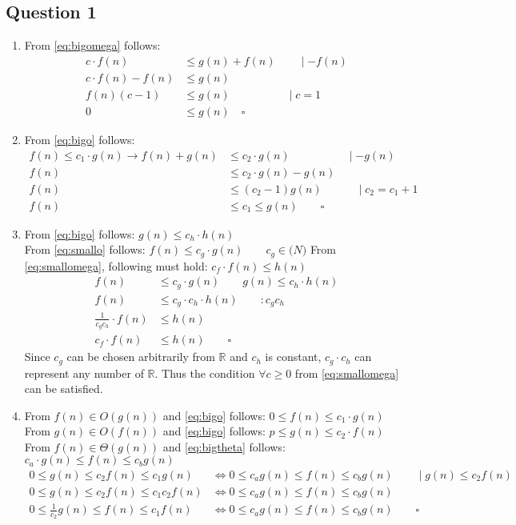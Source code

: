 \documentclass[10pt,a4paper,oneside]{report}
\begin{document}
\subsection{Question 1}
\begin{enumerate}
	\item From \ref{eq:bigomega} follows: \begin{align*}
			c\cdot f(n)&\leq g(n)+f(n)\qquad\mid -f(n)	\\
			c\cdot f(n)-f(n)&\leq g(n)					\\
			f(n)(c-1)&\leq g(n)\qquad\qquad\quad\mid c=1			\\
			0&\leq g(n)\quad\square
		\end{align*}
		
	\item From \ref{eq:bigo} follows: \begin{align*}
			f(n)\leq c_{1}\cdot g(n)\longrightarrow f(n)+g(n)&\leq c_{2}\cdot g(n)\qquad\qquad\quad\mid -g(n)\\
			f(n)&\leq c_{2}\cdot g(n)-g(n)				\\
			f(n)&\leq (c_{2}-1)g(n)\qquad\quad\mid c_{2}=c_{1}+1	\\
			f(n)&\leq c_{1}\leq g(n)\qquad\square
		\end{align*}
		
	\item From \ref{eq:bigo} follows: $g(n)\leq c_{h}\cdot h(n)$\\
		From \ref{eq:smallo} follows: $f(n)\leq c_{g}\cdot g(n)\qquad c_{g}\in\mathbb(N)$
		From \ref{eq:smallomega}, following must hold: $c_{f}\cdot f(n)\leq h(n)$
		\begin{align*}
			f(n)&\leq c_{g}\cdot g(n)\qquad g(n)\leq c_{h}\cdot h(n)\\
			f(n)&\leq c_{g}\cdot c_{h}\cdot h(n)\qquad :c_{g}c_{h}\\
			\frac{1}{c_{g}c_{h}}\cdot f(n)&\leq h(n)\\
			c_{f}\cdot f(n)&\leq h(n)\qquad\square
		\end{align*}
		Since $c_{g}$ can be chosen arbitrarily from $\mathbb{R}$ and $c_{h}$ is constant, $c_{g}\cdot c_{h}$ can represent any number of $\mathbb{R}$. Thus the condition $\forall c\geq 0$ from \ref{eq:smallomega} can be satisfied.
		
		\item From $f(n)\in O(g(n))$ and \ref{eq:bigo} follows: $0\leq f(n)\leq c_{1}\cdot g(n)$\\
		From $g(n)\in O(f(n))$ and \ref{eq:bigo} follows: $p\leq g(n)\leq c_{2}\cdot f(n)$
		From $f(n)\in\Theta(g(n))$ and \ref{eq:bigtheta} follows: $c_{a}\cdot g(n)\leq f(n)\leq c_{b}g(n)$
		\begin{align*}
			0\leq g(n)\leq c_{2}f(n)\leq c_{1}g(n) &\Longleftrightarrow 0\leq c_{a}g(n)\leq f(n)\leq c_{b}g(n) \qquad\mid g(n)\leq c_{2}f(n)\\
			0\leq g(n)\leq c_{2}f(n)\leq c_{1}c_{2}f(n) &\Longleftrightarrow 0\leq c_{a}g(n)\leq f(n)\leq c_{b}g(n)	\\
			0\leq \frac{1}{c_{2}}g(n)\leq f(n)\leq c_{1}f(n) &\Longleftrightarrow 0\leq c_{a}g(n)\leq f(n)\leq c_{b}g(n)\qquad\square
		\end{align*}
\end{enumerate}
\end{document}
